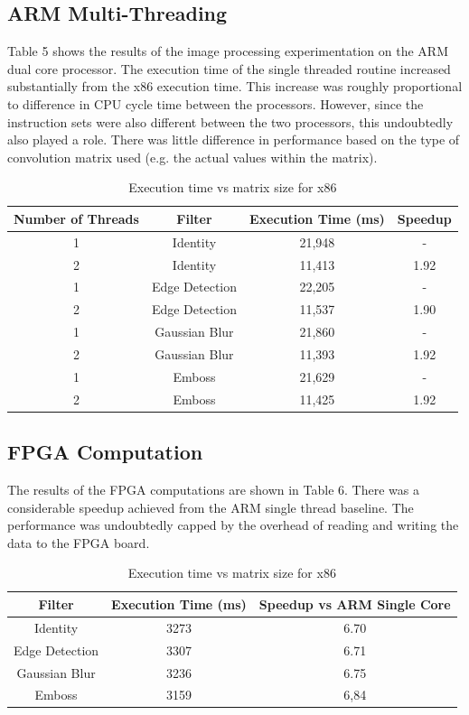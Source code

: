\documentclass{article} %
\begin{document}
\subsection{ARM Multi-Threading}
Table 5 shows the results of the image processing experimentation on the ARM dual core processor.  The execution time of the single threaded routine increased substantially from the x86 execution time.  This increase was roughly proportional to difference in CPU cycle time between the processors.  However, since the instruction sets were also different between the two processors, this undoubtedly also played a role. There was little difference in performance based on the type of convolution matrix used (e.g. the actual values within the matrix). 
\begin{table}[h!]
\centering
\begin{tabular}{|c|c|c|c|}
\hline
\textbf{Number of Threads} & \textbf{Filter} & \textbf{Execution Time (ms)} & \textbf{Speedup} \\
\hline\hline
1 & Identity & 21,948 & - \\
2 & Identity & 11,413 & 1.92  \\
1 & Edge Detection & 22,205 & - \\
2 & Edge Detection & 11,537 & 1.90 \\
1 & Gaussian Blur & 21,860 & - \\
2 & Gaussian Blur & 11,393 & 1.92 \\
1 & Emboss & 21,629 & - \\
2 & Emboss & 11,425 & 1.92 \\
\hline
\end{tabular}
\caption{Execution time vs matrix size for x86}
\end{table}

\subsection{FPGA Computation}
The results of the FPGA computations are shown in Table 6.  There was a considerable speedup achieved from the ARM single thread baseline.  The performance was undoubtedly capped by the overhead of reading and writing the data to the FPGA board.

\begin{table}[h!]
\centering
\begin{tabular}{|c|c|c|}
\hline
\textbf{Filter} & \textbf{Execution Time (ms)} & \textbf{Speedup vs ARM Single Core} \\
\hline\hline
Identity & 3273 & 6.70 \\
Edge Detection & 3307 & 6.71 \\
Gaussian Blur & 3236 & 6.75 \\
Emboss & 3159 & 6,84 \\
\hline
\end{tabular}
\caption{Execution time vs matrix size for x86}
\end{table}
\end{document}

